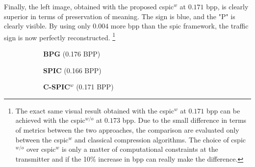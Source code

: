 Finally, the left image, obtained with the proposed \gls{cspic}$^w$ at $0.171$ \gls{bpp}, is clearly superior in terms of preservation of meaning. The sign is blue, and the "P" is clearly visible. By using only $0.004$ more \gls{bpp} than the \gls{spic} framework, the traffic sign is now perfectly reconstructed.
\footnote{The exact same visual result obtained with the \gls{cspic}$^w$ at $0.171$ \gls{bpp} can be achieved with the \gls{cspic}$^{w/o}$ at $0.173$ \gls{bpp}. Due to the small difference in terms of metrics between the two approaches, the comparison are evaluated only between the \gls{cspic}$^w$ and classical compression algorithms. The choice of \gls{cspic}$^{w/o}$ over \gls{cspic}$^w$ is only a matter of computational constraints at the transmitter and if the 10\% increase in \gls{bpp} can really make the difference.}
\begin{figure}[!t]
    \centering
    \begin{subfigure}{\textwidth}
        \centering
        \begin{minipage}{0.333\textwidth}
            \centering
            \textbf{BPG} (0.176 BPP)
        \end{minipage}%
        \begin{minipage}{0.333\textwidth}
            \centering
            \textbf{SPIC} (0.166 BPP)
        \end{minipage}%
        \begin{minipage}{0.333\textwidth}
            \centering
            \textbf{C-SPIC$^w$} (0.171 BPP)
        \end{minipage}
    \end{subfigure}
    

\end{figure}
